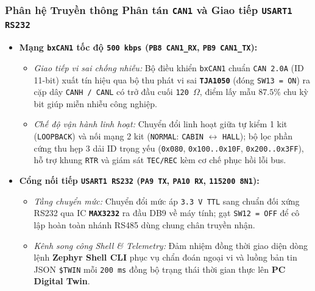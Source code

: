 \subsubsection{Phân hệ Truyền thông Phân tán \texttt{CAN1} và Giao tiếp \texttt{USART1 RS232}}
\begin{itemize}[nosep]
    \item \textbf{Mạng \texttt{bxCAN1} tốc độ \texttt{500~kbps} (\texttt{PB8 CAN1\_RX}, \texttt{PB9 CAN1\_TX}):}
    \begin{itemize}[nosep]
        \item \textit{Giao tiếp vi sai chống nhiễu:} Bộ điều khiển \texttt{bxCAN1} chuẩn \texttt{CAN 2.0A} (ID 11-bit) xuất tín hiệu qua bộ thu phát vi sai \textbf{\texttt{TJA1050}} (đóng \texttt{SW13 = ON}) ra cặp dây \texttt{CANH / CANL} có trở đầu cuối \texttt{120~$\Omega$}, điểm lấy mẫu $87.5\%$ chu kỳ bit giúp miễn nhiễu công nghiệp.
        \item \textit{Chế độ vận hành linh hoạt:} Chuyển đổi linh hoạt giữa tự kiểm 1 kit (\texttt{LOOPBACK}) và nối mạng 2 kit (\texttt{NORMAL}: \texttt{CABIN} $\leftrightarrow$ \texttt{HALL}); bộ lọc phần cứng thu hẹp 3 dải ID trọng yếu (\texttt{0x080}, \texttt{0x100..0x10F}, \texttt{0x200..0x3FF}), hỗ trợ khung \texttt{RTR} và giám sát \texttt{TEC/REC} kèm cơ chế phục hồi lỗi bus.
    \end{itemize}
    \item \textbf{Cổng nối tiếp \texttt{USART1 RS232} (\texttt{PA9 TX}, \texttt{PA10 RX}, \texttt{115200 8N1}):}
    \begin{itemize}[nosep]
        \item \textit{Tầng chuyển mức:} Chuyển đổi mức áp \texttt{3.3~V TTL} sang chuẩn đối xứng RS232 qua IC \textbf{\texttt{MAX3232}} ra đầu DB9 về máy tính; gạt \texttt{SW12 = OFF} để cô lập hoàn toàn nhánh RS485 dùng chung chân truyền nhận.
        \item \textit{Kênh song công Shell \& Telemetry:} Đảm nhiệm đồng thời giao diện dòng lệnh \textbf{Zephyr Shell CLI} phục vụ chẩn đoán ngoại vi và luồng bản tin JSON \texttt{\$TWIN} mỗi \texttt{200~ms} đồng bộ trạng thái thời gian thực lên \textbf{PC Digital Twin}.
    \end{itemize}
\end{itemize}

\clearpage
